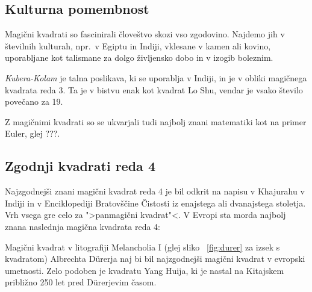 \documentclass[a4paper,12pt]{article}
\newcommand{\pojem}[1]{\emph {\color{purple} #1 }}
\theoremstyle{plain}
\theoremstyle{definition}
\begin{document}


\subsection{Kulturna pomembnost}

Magični kvadrati so fascinirali človeštvo skozi vso zgodovino. Najdemo jih
v številnih kulturah, npr.\ v Egiptu in Indiji, vklesane v kamen ali
kovino, uporabljane kot talismane za dolgo življensko dobo in v
izogib boleznim.

\pojem{Kubera-Kolam} je talna poslikava, ki se uporablja v Indiji, in je v
obliki magičnega kvadrata reda 3. Ta je v bistvu enak kot kvadrat
Lo Shu, vendar je vsako število povečano za 19.


Z magičnimi kvadrati so se ukvarjali tudi najbolj znani matematiki kot na
primer Euler, glej ???. %


\subsection{Zgodnji kvadrati reda 4}

Najzgodnejši znani magični kvadrat reda 4 je bil odkrit na napisu
v Khajurahu v Indiji in v Enciklopediji Bratovščine Čistosti iz enajstega
ali dvanajstega stoletja. Vrh vsega gre celo za ">panmagični kvadrat"<.
V Evropi sta morda najbolj znana naslednja magična kvadrata reda 4:

Magični kvadrat v litografiji Melancholia I (glej sliko ~\ref{fig:durer}
za izsek s kvadratom) Albrechta Dürerja naj bi bil najzgodnejši magični kvadrat
v evropski umetnosti. Zelo podoben je kvadratu Yang Huija, ki je nastal na Kitajskem
približno 250 let pred Dürerjevim časom. %
\end{document}
